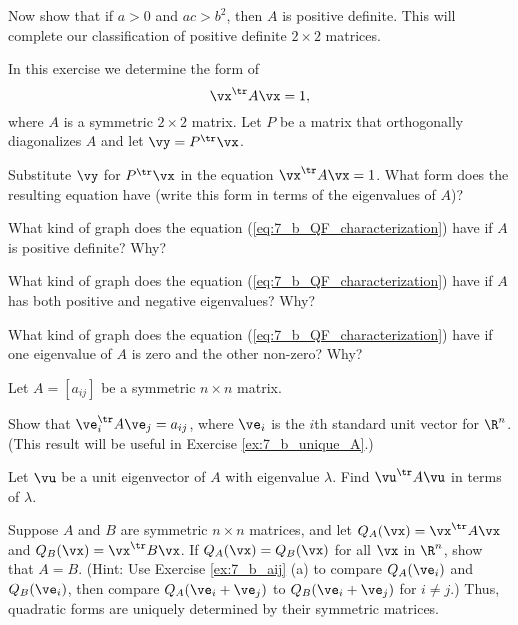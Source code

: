 	\item Now show that if $a > 0$ and $ac > b^2$, then $A$ is positive definite. This will complete our classification of positive definite $2 \times 2$ matrices.  


	\ea


\item \label{ex:7_b_QF_characterization} In this exercise we determine the form of
\begin{equation} \label{eq:7_b_QF_characterization}
\vx^{\tr}A\vx=1,
\end{equation}
where $A$ is a symmetric $2 \times 2$ matrix. Let $P$ be a matrix that orthogonally diagonalizes $A$ and let $\vy = P^{\tr}\vx$.
    \ba
    \item Substitute $\vy$ for $P^{\tr}\vx$ in the equation $\vx^{\tr}A\vx = 1$. What form does the resulting equation have (write this form in terms of the eigenvalues of $A$)?


    \item What kind of graph does the equation (\ref{eq:7_b_QF_characterization}) have if $A$ is positive definite? Why?

    \item What kind of graph does the equation (\ref{eq:7_b_QF_characterization}) have if $A$ has both positive and negative eigenvalues? Why?
    
    \item What kind of graph does the equation (\ref{eq:7_b_QF_characterization}) have if one eigenvalue of $A$ is zero and the other non-zero? Why?

    \ea

\item \label{ex:7_b_aij} Let $A = [a_{ij}]$ be a symmetric $n \times n$ matrix. 
	\ba
	\item Show that $\ve_i^{\tr}A\ve_j = a_{ij}$, where $\ve_i$ is the $i$th standard unit vector for $\R^n$. (This result will be useful in Exercise \ref{ex:7_b_unique_A}.)

	\item Let $\vu$ be a unit eigenvector of $A$ with eigenvalue $\lambda$. Find $\vu^{\tr}A\vu$ in terms of $\lambda$.  


	\ea
	


\item \label{ex:7_b_unique_A} Suppose $A$ and $B$ are symmetric $n \times n$ matrices, and let $Q_A(\vx) = \vx^{\tr}A\vx$ and $Q_B(\vx) = \vx^{\tr} B\vx$. If $Q_A(\vx) = Q_B(\vx)$ for all $\vx$ in $\R^n$, show that $A=B$.  (Hint: Use Exercise \ref{ex:7_b_aij} (a) to compare $Q_A(\ve_i)$ and $Q_B(\ve_i)$, then compare $Q_A(\ve_i+\ve_j)$ to $Q_B(\ve_i + \ve_j)$ for $i \neq j$.) Thus, quadratic forms are uniquely determined by their symmetric matrices. 



